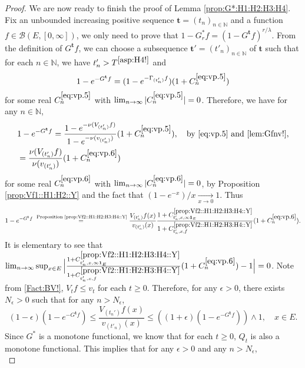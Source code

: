 \documentclass[12pt,a4paper]{amsart}
\numberwithin{equation}{section}
\theoremstyle{plain}
\theoremstyle{definition}
\theoremstyle{remark}
\begin{document}
\begin{proof}
	We are now ready to finish the proof of Lemma \ref{prop:G*:H1:H2:H3:H4}.
	Fix an unbounded increasing positive sequence $\mathbf t=(t_n)_{n\in \mathbb N}$ and a function $f\in \mathcal B(E,[0,\infty])$, we only need to  prove that $1-G_r^* f =(1- G^{\mathbf t}f)^{r/\lambda}.$
	From the definition of $G^{\mathbf t} f$, we can choose a subsequence $\mathbf t'=(t'_n)_{n \in \mathbb N}$ of $\mathbf t$ such that for each $n\in \mathbb N$, we have $t'_n > T^{\eqref{asp:H4!}}$ and
\begin{equation} \label{eq:vp.5}
	1 - e^{- G^{\mathbf t}f}
	=  ( 1 - e^{-\Gamma_{( t_n')} f} ) (1+C^{\eqref{eq:vp.5}}_n)
\end{equation}
	for some real $C^{\eqref{eq:vp.5}}_n$ with $\lim_{n\to \infty} |C^{\eqref{eq:vp.5}}_n| =0$.
	Therefore, we have for any $n \in \mathbb N$,
\begin{align}
	& 1 - e^{- G^{\mathbf t}f}
	= \frac{1 - e^{- \nu( V_{(t_n')}f)}}{1- e^{- \nu(v_{(t_n')})}}  (1+C^{\eqref{eq:vp.5}}_n),\quad\text{by \eqref{eq:vp.5} and \eqref{lem:Gfnv!}},
	\\& \label{eq:vp.6}= \frac{\nu (V_{(t_n')} f)}{\nu(v_{(t_n')})}  (1+C^{\eqref{eq:vp.6}}_n)
\end{align}
	for some real $C^{\eqref{eq:vp.6}}_n$ with $\lim_{n\to \infty} |C^{\eqref{eq:vp.6}}_n| =0$, by Proposition \ref{prop:Vf1::H1:H2::Y} and the fact that $(1- e^{-x})/x \xrightarrow[x\to 0]{}1$.
	Thus
\begin{equation}
	1 - e^{- G^{\mathbf t}f}
	\overset{\text{ Proposition \ref{prop:Vf2::H1:H2:H3:H4::Y}}}=  \frac{V_{(t_n')}f(x)}{v_{(t_n')}(x)} \frac{1+C^{\ref{prop:Vf2::H1:H2:H3:H4::Y}}_{t_n',x,\infty \mathbf 1_E}}{1+C^{\ref{prop:Vf2::H1:H2:H3:H4::Y}}_{t_n',x,f}} (1+C^{\eqref{eq:vp.6}}_n).
\end{equation}
	It is elementary to see that $\lim_{n\to \infty} \sup_{x\in E} \Big|\frac{1+C^{\ref{prop:Vf2::H1:H2:H3:H4::Y}}_{t_n',x,\infty \mathbf 1_E}}{1+C^{\ref{prop:Vf2::H1:H2:H3:H4::Y}}_{t_n',x,f}} (1+C^{\eqref{eq:vp.6}}_n) -1 \Big| = 0$.
	Note from \eqref{Fact:BV!}, $V_tf \leq v_t$ for each $t\geq 0$.
	Therefore, for any $\epsilon>0$, there exists $N_\epsilon>0$ such that for any $n>N_\epsilon$,
\[
	(1-\epsilon) (1 - e^{- G^{\mathbf t}f} )
	\leq \frac{V_{(t_n')}f(x)}{v_{(t'_n)}(x)}
	\leq ((1+\epsilon) ( 1 - e^{- G^{\mathbf t}f} )) \wedge 1,
	\quad x\in E.
\]
	Since $G^*$ is a monotone functional, we know that for each $t\geq 0$, $Q_t$ is also a monotone functional.
	This implies that  for any $\epsilon>0$ and any $n>N_\epsilon$,
\begin{equation} \label{eq:vp.7}

\end{equation}
\end{proof}
\end{document}
